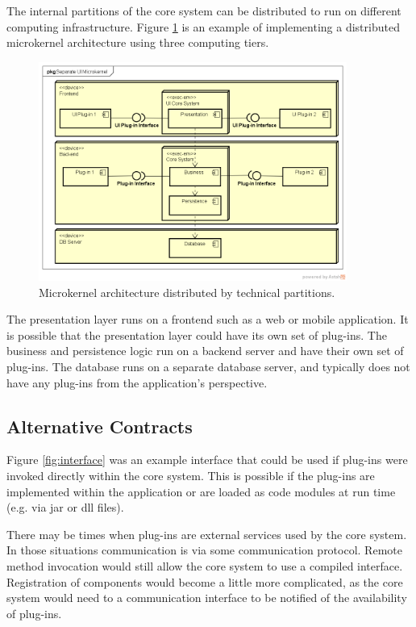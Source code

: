 The internal partitions of the core system can be distributed to run on different computing infrastructure.
Figure \ref{fig:3-tier-microkernel} is an example of implementing a distributed microkernel architecture using three computing tiers.

\begin{figure}[h!]
    \centering
    \includegraphics[trim=40 41 18 43,clip,width=0.9\textwidth]{diagrams/separate-ui-microkernel.png}
    \caption{Microkernel architecture distributed by technical partitions.}
    \label{fig:3-tier-microkernel}
\end{figure}

The presentation layer runs on a frontend such as a web or mobile application.
It is possible that the presentation layer could have its own set of plug-ins.
The business and persistence logic run on a backend server and have their own set of plug-ins.
The database runs on a separate database server, and typically does not have any plug-ins from the application's perspective.

\subsection{Alternative Contracts}

Figure \ref{fig:interface} was an example interface that could be used if plug-ins were invoked directly within the core system.
This is possible if the plug-ins are implemented within the application or are loaded as code modules at run time (e.g. via jar or dll files).

There may be times when plug-ins are external services used by the core system.
In those situations communication is via some communication protocol.
Remote method invocation would still allow the core system to use a compiled interface.
Registration of components would become a little more complicated,
as the core system would need to a communication interface to be notified of the availability of plug-ins.

